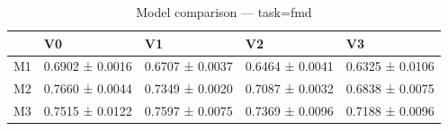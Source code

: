 \begin{table}[htbp]
\centering
\caption{Model comparison — task=fmd}
\label{tab:models:fmd}
\begin{tabular}{lllll}
\toprule
\toprule
 & V0 & V1 & V2 & V3 \\
\midrule
\midrule
M1 & 0.6902 ± 0.0016 & 0.6707 ± 0.0037 & 0.6464 ± 0.0041 & 0.6325 ± 0.0106 \\
M2 & 0.7660 ± 0.0044 & 0.7349 ± 0.0020 & 0.7087 ± 0.0032 & 0.6838 ± 0.0075 \\
M3 & 0.7515 ± 0.0122 & 0.7597 ± 0.0075 & 0.7369 ± 0.0096 & 0.7188 ± 0.0096 \\
\bottomrule
\end{tabular}\end{table}
